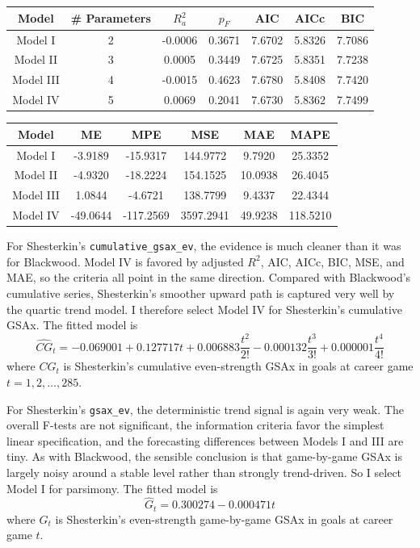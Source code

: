 \documentclass[
  10pt,
]{extarticle}
\begin{document}
\begin{center}
\normalsize

\begin{tabular}{ccccccc}
\toprule
Model & \# Parameters & $R_a^2$ & $p_F$ & AIC & AICc & BIC\\
\midrule
Model I & 2 & -0.0006 & 0.3671 & 7.6702 & 5.8326 & 7.7086\\
Model II & 3 & 0.0005 & 0.3449 & 7.6725 & 5.8351 & 7.7238\\
Model III & 4 & -0.0015 & 0.4623 & 7.6780 & 5.8408 & 7.7420\\
Model IV & 5 & 0.0069 & 0.2041 & 7.6730 & 5.8362 & 7.7499\\
\bottomrule
\end{tabular}
\normalsize
\end{center}
\begin{center}
\normalsize

\begin{tabular}{cccccc}
\toprule
Model & ME & MPE & MSE & MAE & MAPE\\
\midrule
Model I & -3.9189 & -15.9317 & 144.9772 & 9.7920 & 25.3352\\
Model II & -4.9320 & -18.2224 & 154.1525 & 10.0938 & 26.4045\\
Model III & 1.0844 & -4.6721 & 138.7799 & 9.4337 & 22.4344\\
Model IV & -49.0644 & -117.2569 & 3597.2941 & 49.9238 & 118.5210\\
\bottomrule
\end{tabular}
\normalsize
\end{center}

For Shesterkin's \texttt{cumulative\_gsax\_ev}, the evidence is much cleaner than it was for Blackwood. Model IV is favored by adjusted \(R^2\), AIC, AICc, BIC, MSE, and MAE, so the criteria all point in the same direction. Compared with Blackwood's cumulative series, Shesterkin's smoother upward path is captured very well by the quartic trend model. I therefore select Model IV for Shesterkin's cumulative GSAx. The fitted model is
\[
\widehat{CG}_t = -0.069001 + 0.127717 t + 0.006883 \frac{t^2}{2!} - 0.000132 \frac{t^3}{3!} + 0.000001 \frac{t^4}{4!}
\]
where \(CG_t\) is Shesterkin's cumulative even-strength GSAx in goals at career game \(t = 1, 2, \ldots, 285\).

For Shesterkin's \texttt{gsax\_ev}, the deterministic trend signal is again very weak. The overall F-tests are not significant, the information criteria favor the simplest linear specification, and the forecasting differences between Models I and III are tiny. As with Blackwood, the sensible conclusion is that game-by-game GSAx is largely noisy around a stable level rather than strongly trend-driven. So I select Model I for parsimony. The fitted model is
\[
\widehat{G}_t = 0.300274 - 0.000471 t
\]
where \(G_t\) is Shesterkin's even-strength game-by-game GSAx in goals at career game \(t\).
\end{document}
